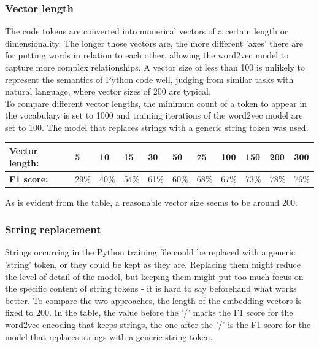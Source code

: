 \documentclass[
a4paper,
pagesize,
pdftex,
12pt,
twoside, %
BCOR=5mm, %
ngerman,
fleqn,
final,
]{scrartcl}
\begin{document}
	\subsubsection{Vector length}
	The code tokens are converted into numerical vectors of a certain length or dimensionality. The longer those vectors are, the more different 'axes' there are for putting words in relation to each other, allowing the word2vec model to capture more complex relationships. A vector size of less than 100 is unlikely to represent the semantics of Python code well, judging from similar tasks with natural language, where vector sizes of 200 are typical.\\
	To compare different vector lengths, the minimum count of a token to appear in the vocabulary is set to 1000 and training iterations of the word2vec model are set to 100. The model that replaces strings with a generic string token was used.
	
	
	
	\begin{tabular}{| p{3.5cm}  | p{0.6cm} | p{0.6cm} | p{0.6cm} | p{0.6cm} | p{0.6cm} | p{0.6cm} | p{0.8cm} | p{0.8cm} | p{0.8cm} | p{0.8cm} | }
		\hline
		\textbf{Vector length:} & 5 & 10 & 15 & 30 & 50 & 75 & 100 & 150 & 200 & 300 \\
		\hline
		
		\textbf{F1 score:} & 29\% & 40\% & 54\% & 61\% & 60\% & 68\% & 67\% & 73\% & 78\% & 76\% \\
		\hline
		\hline
	\end{tabular}
	
	As is evident from the table, a reasonable vector size seems to be around 200. 
	
	
	\subsubsection{String replacement}
	
	Strings occurring in the Python training file could be replaced with a generic 'string' token, or they could be kept as they are. Replacing them might reduce the level of detail of the model, but keeping them might put too much focus on the specific content of string tokens - it is hard to say beforehand what works better. To compare the two approaches, the length of the embedding vectors is fixed to 200. In the table, the value before the '/' marks the F1 score for the word2vec encoding that keeps strings, the one after the '/' is the F1 score for the model that replaces strings with a generic string token. 
	
\end{document}
